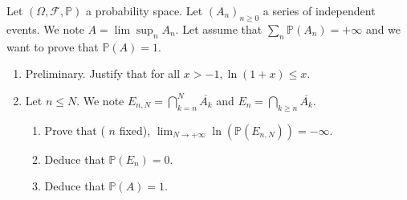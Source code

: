 \begin{Exercise}
  Let $(\Omega, \mathcal{F}, \mathbb{P})$ a probability space. Let $\left(A_n\right)_{n \geq 0}$ a series of independent events. We note $A=\lim \sup _n A_n$. Let assume that $\sum_n \mathbb{P}\left(A_n\right)=+\infty$ and we want to prove that $\mathbb{P}(A)=1$.
  \begin{enumerate}
    \item Preliminary. Justify that for all $x>-1, \ln (1+x) \leq x$.
    \item Let $n \leq N$. We note $E_{n, N}=\bigcap_{k=n}^N \overline{A_k}$ and $E_n=\bigcap_{k \geq n} \overline{A_k}$.
    \begin{enumerate}
      \item Prove that ( $n$ fixed), $\lim _{N \rightarrow+\infty} \ln \left(\mathbb{P}\left(E_{n, N}\right)\right)=-\infty$.
      \item Deduce that $\mathbb{P}\left(E_n\right)=0$.
      \item Deduce that $\mathbb{P}(A)=1$.
    \end{enumerate}
  \end{enumerate}
\end{Exercise}
